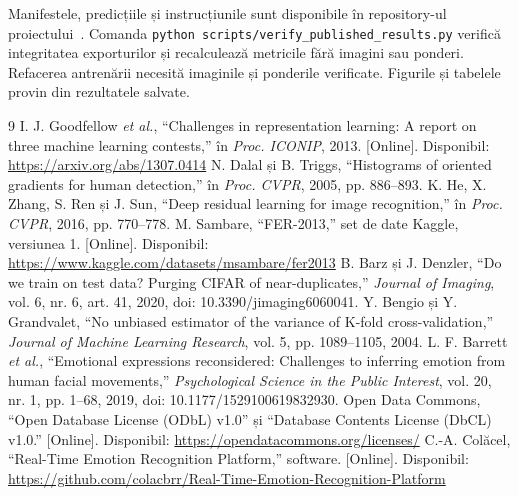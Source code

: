 \documentclass[conference]{IEEEtran}
\begin{document}
Manifestele, predicțiile și instrucțiunile sunt disponibile în repository-ul proiectului~\cite{own_repo}. Comanda \texttt{python scripts/verify\_published\_results.py} verifică integritatea exporturilor și recalculează metricile fără imagini sau ponderi. Refacerea antrenării necesită imaginile și ponderile verificate. Figurile și tabelele provin din rezultatele salvate.

\begin{thebibliography}{9}
 I. J. Goodfellow \emph{et al.}, ``Challenges in representation learning: A report on three machine learning contests,'' în \emph{Proc. ICONIP}, 2013. [Online]. Disponibil: \url{https://arxiv.org/abs/1307.0414}
 N. Dalal și B. Triggs, ``Histograms of oriented gradients for human detection,'' în \emph{Proc. CVPR}, 2005, pp. 886--893.
 K. He, X. Zhang, S. Ren și J. Sun, ``Deep residual learning for image recognition,'' în \emph{Proc. CVPR}, 2016, pp. 770--778.
 M. Sambare, ``FER-2013,'' set de date Kaggle, versiunea 1. [Online]. Disponibil: \url{https://www.kaggle.com/datasets/msambare/fer2013}
 B. Barz și J. Denzler, ``Do we train on test data? Purging CIFAR of near-duplicates,'' \emph{Journal of Imaging}, vol. 6, nr. 6, art. 41, 2020, doi: 10.3390/jimaging6060041.
 Y. Bengio și Y. Grandvalet, ``No unbiased estimator of the variance of K-fold cross-validation,'' \emph{Journal of Machine Learning Research}, vol. 5, pp. 1089--1105, 2004.
 L. F. Barrett \emph{et al.}, ``Emotional expressions reconsidered: Challenges to inferring emotion from human facial movements,'' \emph{Psychological Science in the Public Interest}, vol. 20, nr. 1, pp. 1--68, 2019, doi: 10.1177/1529100619832930.
 Open Data Commons, ``Open Database License (ODbL) v1.0'' și ``Database Contents License (DbCL) v1.0.'' [Online]. Disponibil: \url{https://opendatacommons.org/licenses/}
 C.-A. Colăcel, ``Real-Time Emotion Recognition Platform,'' software. [Online]. Disponibil: \url{https://github.com/colacbrr/Real-Time-Emotion-Recognition-Platform}
\end{thebibliography}
\end{document}
